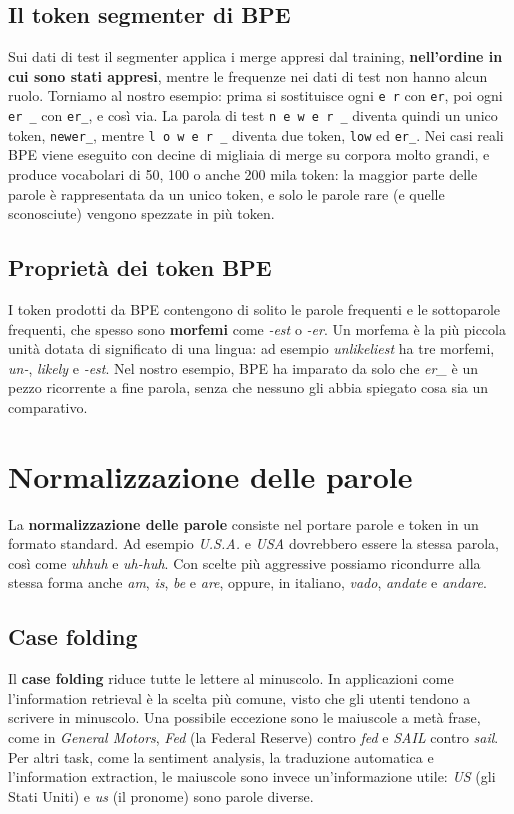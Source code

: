 \subsection{Il token segmenter di BPE}
Sui dati di test il segmenter applica i merge appresi dal training, \textbf{nell'ordine in cui sono stati appresi}, mentre le frequenze nei dati di test non hanno alcun ruolo. Torniamo al nostro esempio: prima si sostituisce ogni \texttt{e r} con \texttt{er}, poi ogni \texttt{er \_} con \texttt{er\_}, e così via. La parola di test \texttt{n e w e r \_} diventa quindi un unico token, \texttt{newer\_}, mentre \texttt{l o w e r \_} diventa due token, \texttt{low} ed \texttt{er\_}. Nei casi reali BPE viene eseguito con decine di migliaia di merge su corpora molto grandi, e produce vocabolari di 50, 100 o anche 200 mila token: la maggior parte delle parole è rappresentata da un unico token, e solo le parole rare (e quelle sconosciute) vengono spezzate in più token.

\subsection{Proprietà dei token BPE}
I token prodotti da BPE contengono di solito le parole frequenti e le sottoparole frequenti, che spesso sono \textbf{morfemi} come \textit{-est} o \textit{-er}. Un morfema è la più piccola unità dotata di significato di una lingua: ad esempio \textit{unlikeliest} ha tre morfemi, \textit{un-}, \textit{likely} e \textit{-est}. Nel nostro esempio, BPE ha imparato da solo che \textit{er\_} è un pezzo ricorrente a fine parola, senza che nessuno gli abbia spiegato cosa sia un comparativo.

\section{Normalizzazione delle parole}
La \textbf{normalizzazione delle parole} consiste nel portare parole e token in un formato standard. Ad esempio \textit{U.S.A.} e \textit{USA} dovrebbero essere la stessa parola, così come \textit{uhhuh} e \textit{uh-huh}. Con scelte più aggressive possiamo ricondurre alla stessa forma anche \textit{am}, \textit{is}, \textit{be} e \textit{are}, oppure, in italiano, \textit{vado}, \textit{andate} e \textit{andare}.

\subsection{Case folding}\label{sec:case-folding}
Il \textbf{case folding} riduce tutte le lettere al minuscolo. In applicazioni come l'information retrieval è la scelta più comune, visto che gli utenti tendono a scrivere in minuscolo. Una possibile eccezione sono le maiuscole a metà frase, come in \textit{General Motors}, \textit{Fed} (la Federal Reserve) contro \textit{fed} e \textit{SAIL} contro \textit{sail}. Per altri task, come la sentiment analysis, la traduzione automatica e l'information extraction, le maiuscole sono invece un'informazione utile: \textit{US} (gli Stati Uniti) e \textit{us} (il pronome) sono parole diverse.

